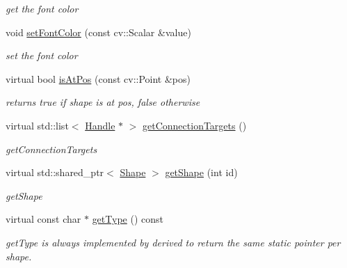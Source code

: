 \begin{DoxyCompactItemize}
\begin{DoxyCompactList}\small\item\em get the font color \end{DoxyCompactList}\item 
void \hyperlink{classcanvascv_1_1TextBox_ac2afa4502f04041000cd574fffaedcb4}{set\+Font\+Color} (const cv\+::\+Scalar \&value)\hypertarget{classcanvascv_1_1TextBox_ac2afa4502f04041000cd574fffaedcb4}{}\label{classcanvascv_1_1TextBox_ac2afa4502f04041000cd574fffaedcb4}

\begin{DoxyCompactList}\small\item\em set the font color \end{DoxyCompactList}\item 
virtual bool \hyperlink{classcanvascv_1_1TextBox_ab2545275695758bcd99c85560299bed8}{is\+At\+Pos} (const cv\+::\+Point \&pos)\hypertarget{classcanvascv_1_1TextBox_ab2545275695758bcd99c85560299bed8}{}\label{classcanvascv_1_1TextBox_ab2545275695758bcd99c85560299bed8}

\begin{DoxyCompactList}\small\item\em returns true if shape is at pos, false otherwise \end{DoxyCompactList}\item 
virtual std\+::list$<$ \hyperlink{classcanvascv_1_1Handle}{Handle} $\ast$ $>$ \hyperlink{classcanvascv_1_1TextBox_aef1fa0cd32292635c1b92b6ecd8b4aad}{get\+Connection\+Targets} ()
\begin{DoxyCompactList}\small\item\em get\+Connection\+Targets \end{DoxyCompactList}\item 
virtual std\+::shared\+\_\+ptr$<$ \hyperlink{classcanvascv_1_1Shape}{Shape} $>$ \hyperlink{classcanvascv_1_1TextBox_a100b59e6be1b9f9290e03654061c0ec1}{get\+Shape} (int id)
\begin{DoxyCompactList}\small\item\em get\+Shape \end{DoxyCompactList}\item 
virtual const char $\ast$ \hyperlink{classcanvascv_1_1TextBox_aa9313765c2040647a8fc32d227139c4d}{get\+Type} () const 
\begin{DoxyCompactList}\small\item\em get\+Type is always implemented by derived to return the same static pointer per shape. \end{DoxyCompactList}\end{DoxyCompactItemize}
